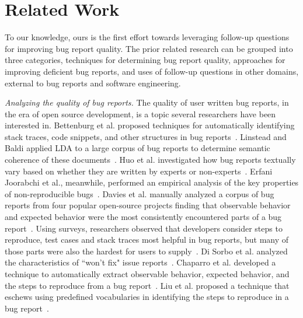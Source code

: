\section{Related Work}
To our knowledge, ours is the first effort towards leveraging follow-up questions for improving bug report quality. The prior related research can be grouped into three categories, techniques for determining bug report quality, approaches for improving deficient bug reports, and uses of follow-up questions in other domains, external to bug reports and software engineering.

\noindent
{\em Analyzing the quality of bug reports.} The quality of user written bug reports, in the era of open source development, is a topic several researchers have been interested in. Bettenburg et al. proposed techniques for automatically identifying stack traces, code snippets, and other structures in bug reports~\cite{bettenburg08extracting}. Linstead and Baldi applied LDA to a large corpus of bug reports to determine semantic coherence of these documents~\cite{linstead09mining}. Huo et al. investigated how bug reports textually vary based on whether they are written by experts or non-experts~\cite{Huo2014AnES}. Erfani Joorabchi et al., meanwhile, performed an empirical analysis of the key properties of non-reproducible bugs~\cite{erfani2014works}. Davies et al. manually analyzed a corpus of bug reports from four popular open-source projects finding that observable behavior and expected behavior were the most consistently encountered parts of a bug report~\cite{davies14whats}. Using surveys, researchers observed that developers consider steps to reproduce, test cases and stack traces most helpful in bug reports, but many of those parts were also the hardest for users to supply~\cite{sasso2016satisficing}. Di Sorbo et al. analyzed the characteristics of ``won't fix" issue reports~\cite{Sorbo2019WontWF}. Chaparro et al. developed a technique to automatically extract observable behavior, expected behavior, and the steps to reproduce from a bug report~\cite{chaparro17detecting}. Liu et al. proposed a technique that eschews using predefined vocabularies in identifying the steps to reproduce in a bug report~\cite{liu2020automated}.

